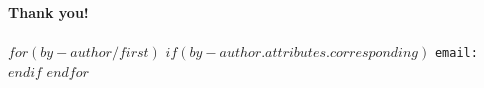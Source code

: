 \begin{frame}
    \begin{center}
        {\Huge{\textbf{\textcolor[rgb]{0.00,0.00,1.00}{Thank you!}}}}\\
        \vspace{1cm}
        \insertauthor\\
        $for(by-author/first)$
            $if(by-author.attributes.corresponding)$
                \texttt{email:\@email}
            $endif$
        $endfor$
    \end{center}
\end{frame}
